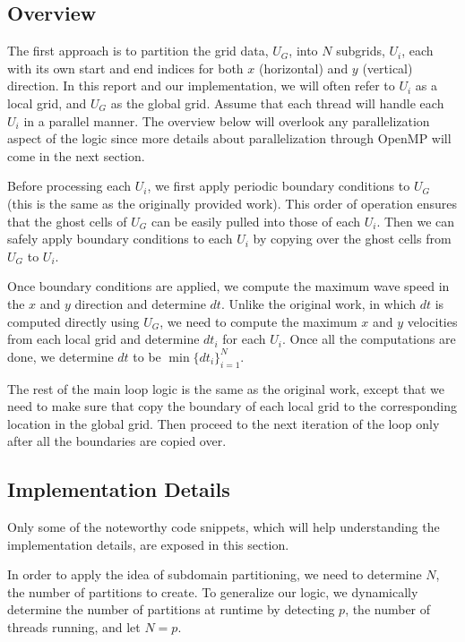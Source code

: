 \documentclass{article}
\begin{document}
\subsection{Overview}
The first approach is to partition the grid data, $U_G$, into $N$ subgrids, $U_i$, each with its own start and end indices for both $x$ (horizontal) and $y$ (vertical) direction. In this report and our implementation, we will often refer to $U_i$ as a local grid, and $U_G$ as the global grid. Assume that each thread will handle each $U_i$ in a parallel manner. The overview below will overlook any parallelization aspect of the logic since more details about parallelization through OpenMP will come in the next section.

Before processing each $U_i$, we first apply periodic boundary conditions to $U_G$ (this is the same as the originally provided work). This order of operation ensures that the ghost cells of $U_G$ can be easily pulled into those of each $U_i$. Then we can safely apply boundary conditions to each $U_i$ by copying over the ghost cells from $U_G$ to $U_i$.

Once boundary conditions are applied, we compute the maximum wave speed in the $x$ and $y$ direction and determine $dt$. Unlike the original work, in which $dt$ is computed directly using $U_G$, we need to compute the maximum $x$ and $y$ velocities from each local grid and determine $dt_i$ for each $U_i$. Once all the computations are done, we determine $dt$ to be $\min\{dt_i\}_{i=1}^N$.

The rest of the main loop logic is the same as the original work, except that we need to make sure that copy the boundary of each local grid to the corresponding location in the global grid. Then proceed to the next iteration of the loop only after all the boundaries are copied over.

\subsection{Implementation Details}

Only some of the noteworthy code snippets, which will help understanding the implementation details, are exposed in this section.

In order to apply the idea of subdomain partitioning, we need to determine $N$, the number of partitions to create. To generalize our logic, we dynamically determine the number of partitions at runtime by detecting $p$, the number of threads running, and let $N = p$.
\end{document}
